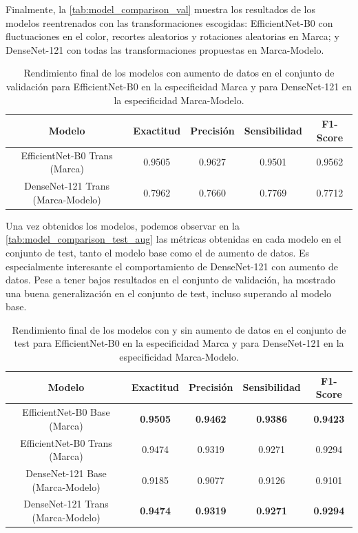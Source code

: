 Finalmente, la \autoref{tab:model_comparison_val} muestra los resultados de los modelos reentrenados con las transformaciones escogidas: EfficientNet-B0 con fluctuaciones en el color, recortes aleatorios y rotaciones aleatorias en Marca; y DenseNet-121 con todas las transformaciones propuestas en Marca-Modelo.

\begin{table}[H]
	\centering
	\begin{adjustbox}{width=0.85\textwidth}
		\begin{tabular}{|c|c|c|c|c|}
			\hline
			\textbf{Modelo} & \textbf{Exactitud} & \textbf{Precisión} & \textbf{Sensibilidad} & \textbf{F1-Score} \\
			\hline
			EfficientNet-B0 Trans (Marca) & 0.9505 & 0.9627 & 0.9501 & 0.9562 \\
			\hline
			\hline
			DenseNet-121 Trans (Marca-Modelo) & 0.7962 & 0.7660 & 0.7769 & 0.7712 \\
			\hline
		\end{tabular}
	\end{adjustbox}
	\caption{Rendimiento final de los modelos con aumento de datos en el conjunto de validación para EfficientNet-B0 en la especificidad Marca y para DenseNet-121 en la especificidad Marca-Modelo.
	}
	\label{tab:model_comparison_val}
\end{table}

Una vez obtenidos los modelos, podemos observar en la \autoref{tab:model_comparison_test_aug} las métricas obtenidas en cada modelo en el conjunto de test, tanto el modelo base como el de aumento de datos. Es especialmente interesante el comportamiento de DenseNet-121 con aumento de datos. Pese a tener bajos resultados en el conjunto de validación, ha mostrado una buena generalización en el conjunto de test, incluso superando al modelo base.

\begin{table}[H]
	\centering
	\begin{adjustbox}{width=0.85\textwidth}
		\begin{tabular}{|c|c|c|c|c|}
			\hline
			\textbf{Modelo} & \textbf{Exactitud} & \textbf{Precisión} & \textbf{Sensibilidad} & \textbf{F1-Score} \\
			\hline
			EfficientNet-B0 Base (Marca) & \textbf{0.9505} & \textbf{0.9462} & \textbf{0.9386} & \textbf{0.9423} \\
			\hline
			EfficientNet-B0 Trans (Marca) & 0.9474 & 0.9319 & 0.9271 & 0.9294 \\
			\hline
			\hline
			DenseNet-121 Base (Marca-Modelo) & 0.9185 & 0.9077 & 0.9126 & 0.9101 \\
			\hline
			DenseNet-121 Trans (Marca-Modelo) & \textbf{0.9474} & \textbf{0.9319} & \textbf{0.9271} & \textbf{0.9294} \\
			\hline
		\end{tabular}
	\end{adjustbox}
	\caption{Rendimiento final de los modelos con y sin aumento de datos en el conjunto de test para EfficientNet-B0 en la especificidad Marca y para DenseNet-121 en la especificidad Marca-Modelo.}
	\label{tab:model_comparison_test_aug}
\end{table}

